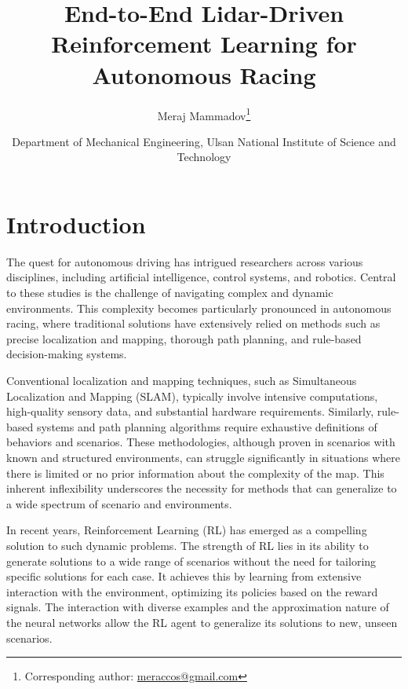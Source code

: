\documentclass[a4paper, 10pt]{LTJournalArticle}
\title{End-to-End Lidar-Driven \\ Reinforcement Learning for Autonomous Racing}
\author{Meraj Mammadov\thanks{Corresponding author: \href{mailto:meraccos@gmail.com}{meraccos@gmail.com}}}
\date{\footnotesize Department of Mechanical Engineering, Ulsan National Institute of Science and Technology}
\begin{document}
\maketitle %


\section{Introduction}

The quest for autonomous driving has intrigued researchers across various disciplines, including artificial intelligence, control systems, and robotics\autocite{Huang:2020}. Central to these studies is the challenge of navigating complex and dynamic environments. This complexity becomes particularly pronounced in autonomous racing, where traditional solutions have extensively relied on methods such as precise localization and mapping, thorough path planning, and rule-based decision-making systems.

Conventional localization and mapping techniques, such as Simultaneous Localization and Mapping (SLAM), typically involve intensive computations, high-quality sensory data, and substantial hardware requirements. Similarly, rule-based systems and path planning algorithms require exhaustive definitions of behaviors and scenarios. These methodologies, although proven in scenarios with known and structured environments, can struggle significantly in situations where there is limited or no prior information about the complexity of the map\autocite{Merzlyakov:2021}. This inherent inflexibility underscores the necessity for methods that can generalize to a wide spectrum of scenario and environments. 

In recent years, Reinforcement Learning (RL) has emerged as a compelling solution to such dynamic problems\autocite{Piotr:2017, Julio:2020, Maximilian:2018}. The strength of RL lies in its ability to generate solutions to a wide range of scenarios without the need for tailoring specific solutions for each case. It achieves this by learning from extensive interaction with the environment, optimizing its policies based on the reward signals. The interaction with diverse examples and the approximation nature of the neural networks allow the RL agent to generalize its solutions to new, unseen scenarios.
\end{document}
